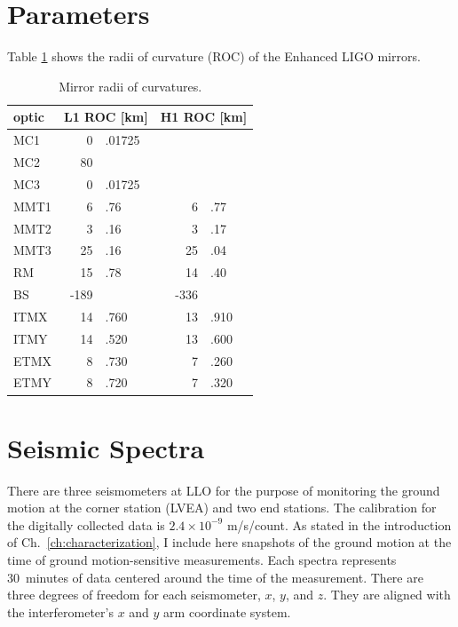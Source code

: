 



\section{Parameters}
Table \ref{tab:ROCs} shows the radii of curvature (ROC) of the Enhanced LIGO mirrors. 
\begin{table}
\centering
\caption{Mirror radii of curvatures.} 
\begin{tabular}{l r@{}l r@{}l}
\hline
optic & \multicolumn{2}{l}{L1 ROC [km]} & \multicolumn{2}{l}{H1 ROC [km]} \\
\hline
MC1 & 0&.01725 & & \\
MC2 & 80&  & & \\ 
MC3 & 0&.01725 & & \\ 
MMT1 & 6&.76 & 6&.77 \\
MMT2 & 3&.16 & 3&.17 \\
MMT3 & 25&.16 & 25&.04\\
RM & 15&.78 & 14&.40 \\
BS & -189& & -336& \\
ITMX & 14&.760 & 13&.910 \\ 
ITMY & 14&.520 & 13&.600 \\
ETMX & 8&.730 & 7&.260 \\
ETMY & 8&.720 & 7&.320 \\
\hline
\end{tabular}
\label{tab:ROCs}
\end{table} 




\section{Seismic Spectra}
\label{sec:groundmotion}
There are three seismometers at LLO for the purpose of monitoring the
ground motion at the corner station (LVEA) and two end stations. The
calibration for the digitally collected data is $2.4 \times 10^{-9}$
m/s/count. As stated in the introduction of
Ch.~\ref{ch:characterization}, I include here snapshots of the ground
motion at the time of ground motion-sensitive measurements. Each
spectra represents 30~minutes of data centered around the time of the
measurement. There are three degrees of freedom for each seismometer,
$x$, $y$, and $z$. They are aligned with the interferometer's $x$ and
$y$ arm coordinate system.

